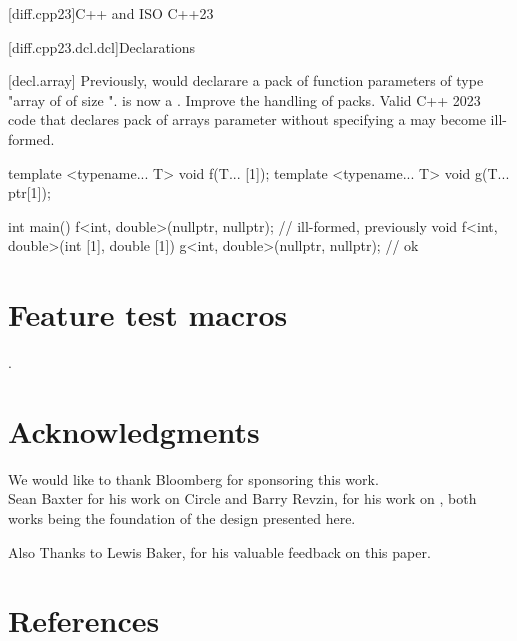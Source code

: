 \documentclass{wg21}
\begin{document}
\begin{addedblock}

[diff.cpp23]{C++ and ISO C++23}

[diff.cpp23.dcl.dcl]{Declarations}

[decl.array]
\change
Previously,  would declarare a pack of function parameters of type "array of  of size ".
 is now a .
\rationale
Improve the handling of packs.
\effect
Valid C++ 2023 code that declares pack of arrays parameter without specifying a  may become ill-formed.

\begin{codeblock}
template <typename... T>
void f(T... [1]);
template <typename... T>
void g(T... ptr[1]);

int main() {
    f<int, double>(nullptr, nullptr); // ill-formed, previously void f<int, double>(int [1], double [1])
    g<int, double>(nullptr, nullptr); // ok
}
\end{codeblock}

\begin{colorblock}

\end{colorblock}

\end{addedblock}

\section{Feature test macros}

.


\section{Acknowledgments}

We would like to thank Bloomberg for sponsoring this work.\\

Sean Baxter for his work on Circle and Barry Revzin, for his work on , both works being the foundation of the design presented here.

Also Thanks to Lewis Baker, for his valuable feedback on this paper.

\section{References}
\end{document}
